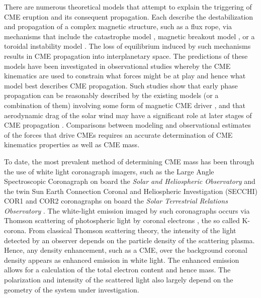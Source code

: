 \documentclass{emulateapj}
\begin{document}
There are numerous theoretical models that attempt to explain the triggering of CME eruption and its consequent propagation. Each describe the destabilization and propagation of a complex magnetic structure, such as a flux rope, via mechanisms that include the catastrophe model \citep{forbes1991,forbes1995,lin2000}, magnetic breakout model \citep{antio99,lynch2008}, or a toroidal instability model \citep{chen1996,kleim2006}. The loss of equilibrium induced by such mechanisms results in CME propagation into interplanetary space. The predictions of these models have been investigated in observational studies whereby the CME kinematics are used to constrain what forces might be at play and hence what model best describes CME propagation. Such studies show that early phase propagation can be reasonably described by the existing models (or a combination of them) involving some form of magnetic CME driver \citep{manoh2003, chen2006, Schrij2008, lin2010}, and that aerodynamic drag of the solar wind may have a significant role at later stages of CME propagation \citep{howard2007, malo10, byr10}. Comparisons between modeling and observational estimates of the forces that drive CMEs requires an accurate determination of CME kinematics properties as well as CME mass.

To date, the most prevalent method of determining CME mass has been through the use of white light coronagraph imagers, such as the Large Angle Spectroscopic Coronagraph  \citep[LASCO;][]{bru95} on board the \emph{Solar and Heliospheric Observatory} \citep[\emph{SOHO};][]{dom95}  and the twin Sun Earth Connection Coronal and Heliospheric Investigation (SECCHI) COR1 and COR2 coronagraphs \citep{how08} on board the \emph{Solar Terrestrial Relations Observatory}  \citep[\emph{STEREO};][]{kai08}. The white-light emission imaged by such coronagraphs occurs via Thomson scattering of photospheric light by coronal electrons \citep{min30, vdeh50, bil66}, the so called K-corona.  From classical Thomson scattering theory, the intensity of the light detected by an observer depends on the particle density of the scattering plasma. Hence, any density enhancement, such as a CME, over the background coronal density appears as enhanced emission in white light. The enhanced emission allows for a calculation of the total electron content and hence mass. The polarization and intensity of the scattered light also largely depend on the geometry of the system under investigation. 
\end{document}
